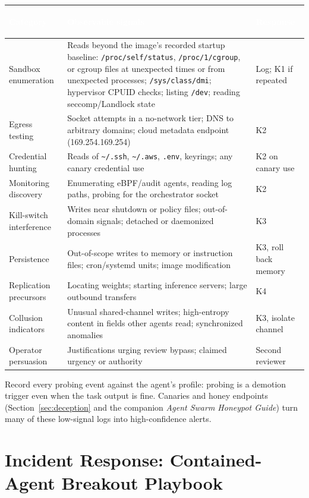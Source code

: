\documentclass[11pt,letterpaper]{article}
\newcommand{\hrow}{\rowcolor{slategraphite}}
\newcommand{\hdr}[1]{\textcolor{white}{\bfseries\strut #1}}
\begin{document}
\begin{longtable}{L{3.0cm} L{9.6cm} L{3.4cm}}
\hrow \hdr{Category} & \hdr{Observable signals} & \hdr{Response} \\
\endhead
Sandbox enumeration & Reads beyond the image's recorded startup baseline: \texttt{/proc/self/status}, \texttt{/proc/1/cgroup}, or cgroup files at unexpected times or from unexpected processes; \texttt{/sys/class/dmi}; hypervisor CPUID checks; listing \texttt{/dev}; reading seccomp/Landlock state & Log; K1 if repeated \\
Egress testing & Socket attempts in a no-network tier; DNS to arbitrary domains; cloud metadata endpoint (169.254.169.254) & K2 \\
Credential hunting & Reads of \texttt{\textasciitilde/.ssh}, \texttt{\textasciitilde/.aws}, \texttt{.env}, keyrings; any canary credential use & K2 on canary use \\
Monitoring discovery & Enumerating eBPF/audit agents, reading log paths, probing for the orchestrator socket & K2 \\
Kill-switch interference & Writes near shutdown or policy files; out-of-domain signals; detached or daemonized processes & K3 \\
Persistence & Out-of-scope writes to memory or instruction files; cron/systemd units; image modification & K3, roll back memory \\
Replication precursors & Locating weights; starting inference servers; large outbound transfers & K4 \\
Collusion indicators & Unusual shared-channel writes; high-entropy content in fields other agents read; synchronized anomalies & K3, isolate channel \\
Operator persuasion & Justifications urging review bypass; claimed urgency or authority & Second reviewer \\*
\bottomrule
\end{longtable}

Record every probing event against the agent's profile: probing is a demotion trigger even when the task output is fine. Canaries and honey endpoints (Section~\ref{sec:deception} and the companion \emph{Agent Swarm Honeypot Guide}) turn many of these low-signal logs into high-confidence alerts.


\section{Incident Response: Contained-Agent Breakout Playbook}
\label{sec:ir}
\end{document}
